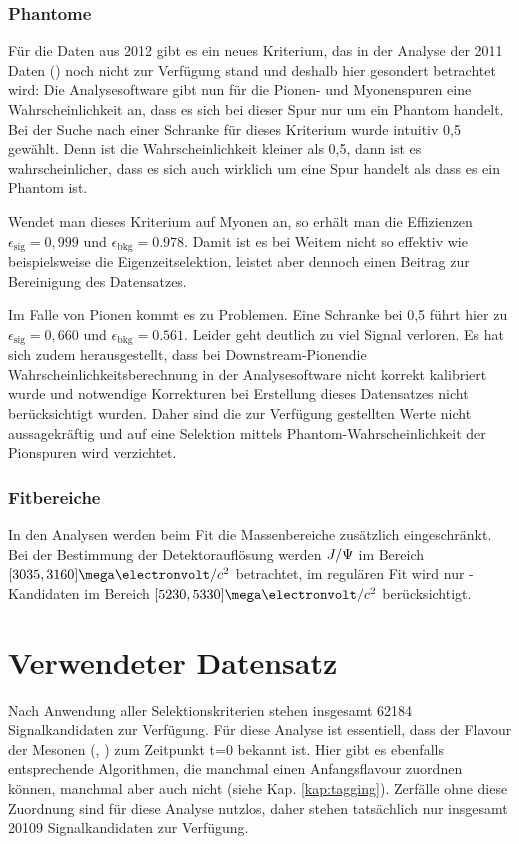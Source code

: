 \subsubsection{Phantome}
Für die Daten aus 2012 gibt es ein neues Kriterium, das in der Analyse der 2011 Daten (\cite{lhcb-paper}) noch nicht zur Verfügung stand und deshalb hier gesondert betrachtet wird: Die Analysesoftware gibt nun für die Pionen- und Myonenspuren eine Wahrscheinlichkeit an, dass es sich bei dieser Spur nur um ein Phantom handelt. Bei der Suche nach einer Schranke für dieses Kriterium wurde intuitiv 0,5 gewählt. Denn ist die Wahrscheinlichkeit kleiner als 0,5, dann ist es wahrscheinlicher, dass es sich auch wirklich um eine Spur handelt als dass es ein Phantom ist.

Wendet man dieses Kriterium auf Myonen an, so erhält man die Effizienzen $\epsilon_{\text{sig}}=0,999$ und $\epsilon_{\text{bkg}}=0.978$. Damit ist es bei Weitem nicht so effektiv wie beispielsweise die Eigenzeitselektion, leistet aber dennoch einen Beitrag zur Bereinigung des Datensatzes.

Im Falle von Pionen kommt es zu Problemen. Eine Schranke bei 0,5 führt hier zu $\epsilon_{\text{sig}}=0,660$ und $\epsilon_{\text{bkg}}=0.561$. Leider geht deutlich zu viel Signal verloren. Es hat sich zudem herausgestellt, dass bei \glqq Downstream-Pionen\grqq die Wahrscheinlichkeitsberechnung in der Analysesoftware nicht korrekt kalibriert wurde und notwendige Korrekturen bei Erstellung dieses Datensatzes nicht berücksichtigt wurden. Daher sind die zur Verfügung gestellten Werte nicht aussagekräftig und auf eine Selektion mittels Phantom-Wahrscheinlichkeit der Pionspuren wird verzichtet.

\subsubsection{Fitbereiche}
In den Analysen werden beim Fit die Massenbereiche zusätzlich eingeschränkt. Bei der Bestimmung der Detektorauflösung werden $J/\Psi$ im Bereich $[3035, 3160]\mega\electronvolt/c^2$ betrachtet, im regulären Fit wird nur \Bd-Kandidaten im Bereich $[5230, 5330]\mega\electronvolt/c^2$ berücksichtigt.

\section{Verwendeter Datensatz}
Nach Anwendung aller Selektionskriterien stehen insgesamt 62184 Signalkandidaten zur Verfügung. Für diese Analyse ist essentiell, dass der Flavour der Mesonen (\Bd, \Bdbar) zum Zeitpunkt t=0 bekannt ist. Hier gibt es ebenfalls entsprechende Algorithmen, die manchmal einen Anfangsflavour zuordnen können, manchmal aber auch nicht (siehe Kap. \ref{kap:tagging}). Zerfälle ohne diese Zuordnung sind für diese Analyse nutzlos, daher stehen tatsächlich nur insgesamt 20109 Signalkandidaten zur Verfügung.